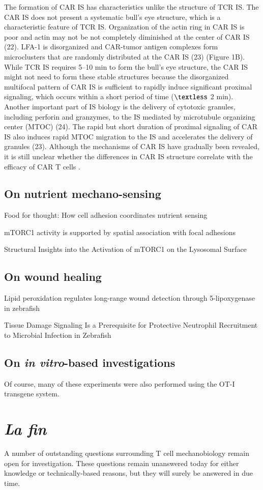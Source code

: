 The formation of CAR IS has characteristics unlike the structure of TCR IS. The CAR IS does not present a systematic bull's eye structure, which is a characteristic feature of TCR IS. Organization of the actin ring in CAR IS is poor and actin may not be not completely diminished at the center of CAR IS (22). LFA-1 is disorganized and CAR-tumor antigen complexes form microclusters that are randomly distributed at the CAR IS (23) (Figure 1B). While TCR IS requires 5–10 min to form the bull's eye structure, the CAR IS might not need to form these stable structures because the disorganized multifocal pattern of CAR IS is sufficient to rapidly induce significant proximal signaling, which occurs within a short period of time ($\textless$ 2 min). Another important part of IS biology is the delivery of cytotoxic granules, including perforin and granzymes, to the IS mediated by microtubule organizing center (MTOC) (24). The rapid but short duration of proximal signaling of CAR IS also induces rapid MTOC migration to the IS and accelerates the delivery of granules (23). Although the mechanisms of CAR IS have gradually been revealed, it is still unclear whether the differences in CAR IS structure correlate with the efficacy of CAR T cells \cite{Li2020, Watanabe2018}.


\subsection{On nutrient mechano-sensing}

Food for thought: How cell adhesion coordinates nutrient sensing

mTORC1 activity is supported by spatial association with focal adhesions

Structural Insights into the Activation of mTORC1 on the Lysosomal Surface

\subsection{On wound healing}

Lipid peroxidation regulates long-range wound detection through 5-lipoxygenase in zebrafish

Tissue Damage Signaling Is a Prerequisite for Protective Neutrophil Recruitment to Microbial Infection in Zebrafish

\subsection{On \textit{in vitro}-based investigations}

Of course, many of these experiments were also performed using the OT-I transgene system. 

\section{\textit{La fin}}

A number of outstanding questions surrounding T cell mechanobiology remain open for investigation. These questions remain unanswered today for either knowledge or technically-based reasons, but they will surely be answered in due time.
